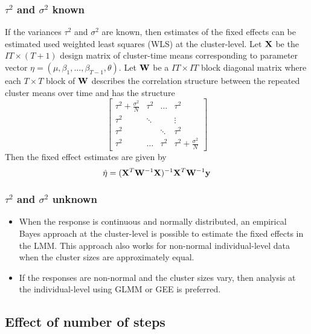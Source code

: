 \documentclass[10pt]{article}
\begin{document}
\subsubsection{$\tau^2$ and $\sigma^2$ known}

If the variances $\tau^2$ and $\sigma^2$ are known, then estimates of the fixed effects can be estimated used weighted least squares (WLS) at the cluster-level. Let $\mathbf{X}$ be the $IT\times(T+1)$ design matrix of cluster-time means corresponding to parameter vector $\eta=(\mu,\beta_1,\ldots,\beta_{T-1},\theta)$. Let $\mathbf{W}$ be a $IT\times IT$ block diagonal matrix where each $T\times T$ block of $\mathbf{W}$ describes the correlation structure between the repeated cluster means over time and has the structure
\[
\begin{bmatrix}
\tau^2 + \frac{\sigma^2}{N} & \tau^2 & \ldots & \tau^2 \\
\tau^2 & \ddots & & \vdots \\
\tau^2 & & \ddots & \tau^2 \\
\tau^2 & \ldots & \tau^2 & \tau^2 + \frac{\sigma^2}{N}
\end{bmatrix}
\]
Then the fixed effect estimates are given by
\[
\hat{\eta} = (\mathbf{X}^T\mathbf{W}^{-1}\mathbf{X})^{-1}\mathbf{X}^T\mathbf{W}^{-1}\mathbf{y}
\]

\subsubsection{$\tau^2$ and $\sigma^2$ unknown}

\begin{itemize}

\item
When the response is continuous and normally distributed, an empirical Bayes approach at the cluster-level is possible to estimate the fixed effects in the LMM. This approach also works for non-normal individual-level data when the cluster sizes are approximately equal.

\item
If the responses are non-normal and the cluster sizes vary, then analysis at the individual-level using GLMM or GEE is preferred.

\end{itemize}



\subsection{Effect of number of steps}
\end{document}
